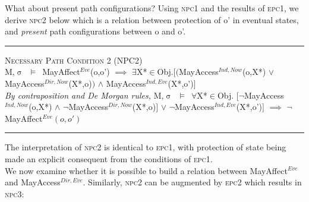 \documentclass[a4paper,11pt, twoside,twocolumn]{article}
\newenvironment{logic}[1][null]
{\begin{flushleft} \small \label{#1}}
{\end{flushleft}}
\newcommand{\loin}{$\in$}
\newcommand{\loforall}{$\forall$}
\newcommand{\loexists}{$\exists$}
\newcommand{\loand}{$\land$}
\newcommand{\loor} {$\lor$}
\newcommand{\loimplies}{$\implies$}
\newcommand{\losigma}{$\upsigma$}
\newcommand{\loturns} {$\vDash$}
\newcommand{\loneg}{$\boldsymbol \neg$}
\newcommand{\ablock} {\null\qquad}
\begin{document}
What about present path configurations? Using \textsc{npc1} and the results of \textsc{epc1}, we derive \textsc{npc2} below which is a relation between protection of o' in eventual states, and \textit{present} path configurations between o and o'.
\begin{logic}
\hrule\null
\textsc{\normalsize *Necessary Path Condition 2 (NPC2)}\\
M,\losigma\ \loturns\ MayAffect$^{Eve}$(o,o')\linebreak
\ablock \loimplies\linebreak
\ablock \loexists X*\loin Obj.$[($MayAccess$^{Ind,Now}$(o,X*) \loor \linebreak
\ablock \ablock \ablock \ablock MayAccess$^{Dir,Now}$(X*,o)$)$\linebreak
\ablock \ablock \ablock \ablock \loand \linebreak
\ablock \ablock \ablock \ablock MayAccess$^{Ind,Eve}$(X*,o')$]$
\linebreak \\
\textit{By contraposition and De Morgan rules,}\linebreak
M,\losigma\ \loturns\ 
\loforall X*\loin Obj. $[$\loneg MayAccess$^{Ind,Now}$(o,X*) \loand \linebreak
\ablock \ablock \ablock \ablock \loneg MayAccess$^{Dir,Now}$(X*,o)$]$\linebreak
\ablock \ablock \ablock \ablock \loor \linebreak
\ablock \ablock \ablock \ablock \loneg MayAccess$^{Ind,Eve}$(X*,o')$]$\linebreak
\ablock \loimplies \linebreak
	\ablock\loneg MayAffect$^{Eve}(o,o')$\linebreak
\hrule
\end{logic}
The interpretation of \textsc{npc2} is identical to \textsc{epc1}, with protection of state being made an explicit consequent from the conditions of \textsc{epc1}.\\
We now examine whether it is possible to build a relation between MayAffect$^{Eve}$ and MayAccess$^{Dir,Eve}$.
Similarly, \textsc{npc2} can be augmented by \textsc{epc2} which results in \textsc{npc3}:
\end{document}
